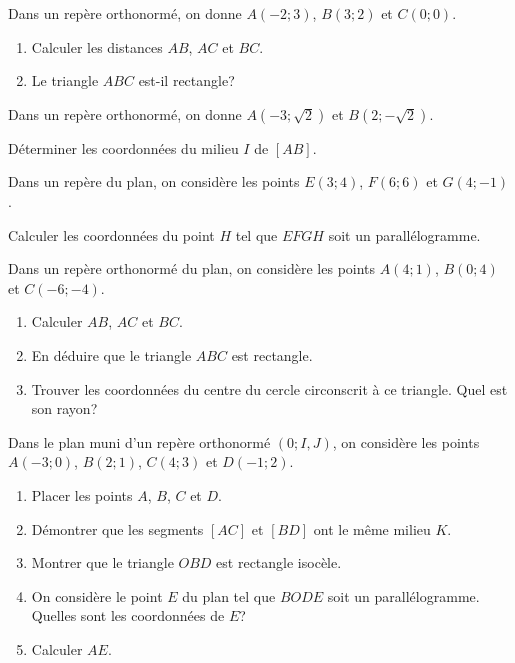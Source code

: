 \documentclass[a4paper]{article}
\begin{document}
\medskip

\begin{exercice}{}{}
    Dans un repère orthonormé, on donne $A(-2; 3)$, $B(3;2)$ et $C(0;0)$.

    \begin{enumerate}
        \item Calculer les distances $AB$, $AC$ et $BC$.
        \item Le triangle $ABC$ est-il rectangle?
    \end{enumerate}
\end{exercice}
\medskip

\begin{exercice}{}{}
Dans un repère orthonormé, on donne $A(-3;\sqrt{2})$ et $B(2;-\sqrt{2})$.

Déterminer les coordonnées du milieu $I$ de $[AB]$.
    
\end{exercice}

\medskip
\begin{exercice}{}{}
    Dans un repère du plan, on considère les points $E(3;4)$, $F(6;6)$ et $G(4;-1)$.

    Calculer les coordonnées du point $H$ tel que $EFGH$ soit un parallélogramme.
\end{exercice}

\medskip
\begin{exercice}{}{}
Dans un repère orthonormé du plan, on considère les points $A(4;1)$, $B(0;4)$ et $C(-6;-4)$.
\begin{enumerate}
    \item Calculer $AB$, $AC$ et $BC$.
    \item En déduire que le triangle $ABC$ est rectangle.
    \item Trouver les coordonnées du centre du cercle circonscrit à ce triangle. Quel est son rayon?
\end{enumerate}
\end{exercice}

\medskip
\begin{exercice}{}{}
     Dans le plan muni d'un repère orthonormé $(0;I,J)$, on considère les points $A(-3;0)$, $B(2;1)$, $C(4;3)$ et $D(-1;2)$.

     \begin{enumerate}
         \item Placer les points $A$, $B$, $C$ et $D$.
         \item Démontrer que les segments $[AC]$ et $[BD]$ ont le même milieu $K$.
         \item Montrer que le triangle $OBD$ est rectangle isocèle.
         \item On considère le point $E$ du plan tel que $BODE$ soit un parallélogramme. Quelles sont les coordonnées de $E$?
         \item Calculer $AE$.
     \end{enumerate}
\end{exercice}
\end{document}

